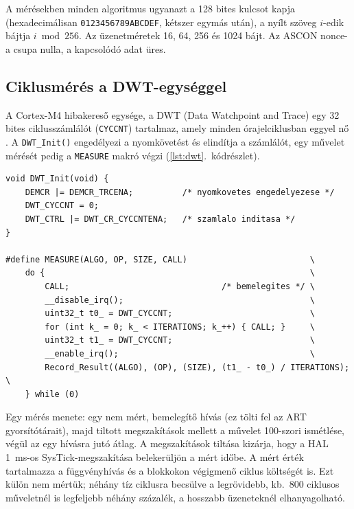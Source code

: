 \documentclass[a4paper,12pt]{report}
\theoremstyle{definition}
\theoremstyle{remark}
\begin{document}
A mérésekben minden algoritmus ugyanazt a 128 bites kulcsot kapja (hexadecimálisan \texttt{0123456789ABCDEF}, kétszer egymás után), a nyílt szöveg $i$-edik bájtja $i \bmod 256$. Az üzenetméretek 16, 64, 256 és 1024 bájt. Az ASCON nonce-a csupa nulla, a kapcsolódó adat üres.

\subsection{Ciklusmérés a DWT-egységgel}

A Cortex-M4 hibakereső egysége, a DWT (Data Watchpoint and Trace) egy 32 bites ciklusszámlálót (\texttt{CYCCNT}) tartalmaz, amely minden órajelciklusban eggyel nő \cite{ARMCM4}. A \mbox{\texttt{DWT\_Init()}} engedélyezi a nyomkövetést és elindítja a számlálót, egy művelet mérését pedig a \texttt{MEASURE} makró végzi (\ref{lst:dwt}.~kódrészlet).

\noindent\begin{minipage}{\textwidth}
\begin{verbatim}
void DWT_Init(void) {
    DEMCR |= DEMCR_TRCENA;          /* nyomkovetes engedelyezese */
    DWT_CYCCNT = 0;
    DWT_CTRL |= DWT_CR_CYCCNTENA;   /* szamlalo inditasa */
}

#define MEASURE(ALGO, OP, SIZE, CALL)                         \
    do {                                                      \
        CALL;                               /* bemelegites */ \
        __disable_irq();                                      \
        uint32_t t0_ = DWT_CYCCNT;                            \
        for (int k_ = 0; k_ < ITERATIONS; k_++) { CALL; }     \
        uint32_t t1_ = DWT_CYCCNT;                            \
        __enable_irq();                                       \
        Record_Result((ALGO), (OP), (SIZE), (t1_ - t0_) / ITERATIONS); \
    } while (0)
\end{verbatim}
\label{lst:dwt}
\end{minipage}

\medskip

Egy mérés menete: egy nem mért, bemelegítő hívás (ez tölti fel az ART gyorsítótárait), majd tiltott megszakítások mellett a művelet 100-szori ismétlése, végül az egy hívásra jutó átlag. A megszakítások tiltása kizárja, hogy a HAL 1~ms-os SysTick-megszakítása belekerüljön a mért időbe. A mért érték tartalmazza a függvényhívás és a blokkokon végigmenő ciklus költségét is. Ezt külön nem mértük; néhány tíz ciklusra becsülve a legrövidebb, kb.\ 800 ciklusos műveletnél is legfeljebb néhány százalék, a hosszabb üzeneteknél elhanyagolható. %
\end{document}
